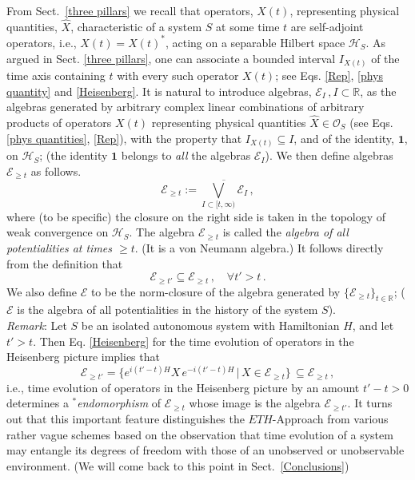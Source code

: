 \documentclass[a4paper,11pt]{article}
\begin{document}
From Sect.~\ref{three pillars} we recall that operators, $X(t)$, representing physical quantities, $\hat{X}$, characteristic 
of a system $S$ at some time $t$  are self-adjoint operators, i.e., $X(t)=X(t)^{*}$, acting on a separable 
Hilbert space $\mathcal{H}_S$. As argued in Sect. \ref{three pillars}, one can associate a bounded interval 
$I_{X(t)}$ of the time axis containing $t$ with every such operator  $X(t)$; see Eqs. \eqref{Rep}, \eqref{phys quantity} 
and \eqref{Heisenberg}. It is natural to introduce algebras, $\mathcal{E}_I\,, I \subset \mathbb{R}$, as the algebras generated 
by arbitrary complex linear combinations of arbitrary products of operators $X(t)$ representing physical 
quantities $\hat{X} \in \mathcal{O}_S$ (see Eqs. \eqref{phys quantities}, \eqref{Rep}), with the property 
that $I_{X(t)} \subseteq I$, and of the identity, $\mathbf{1}$, on $\mathcal{H}_S$; (the identity $\mathbf{1}$ 
belongs to \textit{all} the algebras $\mathcal{E}_I$). We then define algebras $\mathcal{E}_{\geq t}$ as follows.
\begin{equation}\label{events}
\mathcal{E}_{\geq t} := \overline{\bigvee_{I \subset [t, \infty)} \mathcal{E}_I}\,,
\end{equation}
where (to be specific) the closure on the right side is taken in the topology of weak convergence on $\mathcal{H}_S$. 
The algebra $\mathcal{E}_{\geq t}$ is called the \textit{algebra of all potentialities at times $\geq t$}. (It is a von Neumann algebra.) It follows directly from the definition that 
\begin{equation}\label{inclusion}
\mathcal{E}_{\geq t'} \subseteq \mathcal{E}_{\geq t}\,, \quad \forall t' > t\,.
\end{equation}
We also define $\mathcal{E}$ to be the norm-closure of the algebra generated by 
$\big\{ \mathcal{E}_{\geq t} \big\}_{t\in \mathbb{R}}$; ($\mathcal{E}$ is the algebra of all potentialities in the history of the system $S$).\\

\textit{Remark}: Let $S$ be an isolated autonomous system with Hamiltonian $H$, and let $t'>t$. Then Eq. \eqref{Heisenberg} 
for the time evolution of operators in the Heisenberg picture implies that
\begin{equation}\label{automorphism}
\mathcal{E}_{\geq t'}= \big\{e^{i(t'-t)H} X\, e^{-i(t'-t)H} \,\vert\, X\in \mathcal{E}_{\geq t}\big\}\,\subseteq \mathcal{E}_{\geq t}\,,
\end{equation}
i.e., time evolution of operators in the Heisenberg picture by an amount $t'-t>0$ determines a \textit{$^{*}$endomorphism} 
of $\mathcal{E}_{\geq t}$ whose image is the algebra $\mathcal{E}_{\geq t'}$. It turns out that this important feature 
distinguishes the $ETH$-Approach  from various rather vague schemes based on the observation that time evolution 
of a system may entangle its degrees of freedom with those of an unobserved or unobservable environment. (We will 
come back to this point in Sect.~\ref{Conclusions})\\
\end{document}
